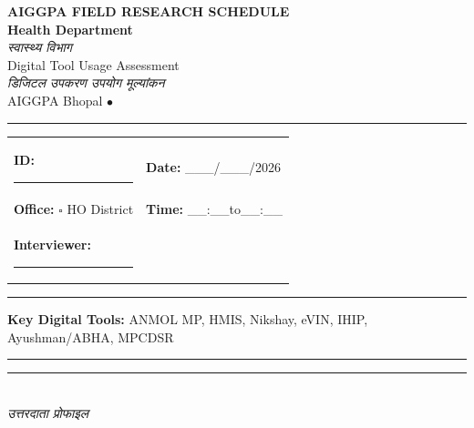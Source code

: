 \documentclass[10pt,a4paper]{article}
\newcommand{\blank}{\rule{7cm}{0.4pt}}
\begin{document}
\begin{center}
{\Large\bfseries AIGGPA FIELD RESEARCH SCHEDULE}\\[1pt]
{\large\bfseries Health Department}\\[1pt]
{\hindifont\itshape\color{black!70} स्वास्थ्य विभाग}\\[4pt]
{\small Digital Tool Usage Assessment}\\[1pt]
{\small\hindifont\itshape\color{black!70} डिजिटल उपकरण उपयोग मूल्यांकन}\\[3pt]
{\small AIGGPA Bhopal \quad$\bullet$}
\end{center}
\vspace{4pt}\noindent\rule{\textwidth}{1pt}\vspace{4pt}
\noindent\begin{tabularx}{\textwidth}{@{}L{9.5cm} X@{}}
\textbf{ID:} \blank & \textbf{Date:} \_\_\_/\_\_\_/2026 \\[4pt]
\textbf{Office:} {\Large$\square$} HO\quad{\Large$\square$} District & \textbf{Time:} \_\_:\_\_\quad to\quad\_\_:\_\_ \\[4pt]
\textbf{Interviewer:} \blank & \\
\end{tabularx}
\vspace{4pt}\noindent\rule{\textwidth}{0.5pt}\vspace{4pt}
\noindent\textbf{Key Digital Tools:} ANMOL MP, HMIS, Nikshay, eVIN, IHIP, Ayushman/ABHA, MPCDSR
\vspace{3pt}\noindent\rule{\textwidth}{0.5pt}
\noindent\rule{\textwidth}{0.3pt}\vspace{3pt}
\\
{\hindifont\itshape\color{black!70} उत्तरदाता प्रोफाइल}\vspace{3pt}
\end{document}
